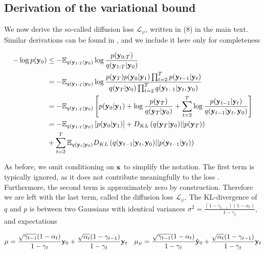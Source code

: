 \subsection{Derivation of the variational bound}

We now derive the so-called diffusion loss $\mathcal{L}_{\psi}$, written in (8) in the main text. Similar derivations can be found in \parencite{Kingma2021,Ribeiro2024}, and we include it here only for completeness

\begin{align*}
-\log p(\bold{y}_{0}) &\leq - \mathbb{E}_{q(\bold{y}_{1:T}\lvert\bold{y}_{0})} \log \frac{p(\bold{y}_{0:T})}{q(\bold{y}_{1:T}\lvert\bold{y}_{0})}\\
&= -\mathbb{E}_{q(\bold{y}_{1:T}\lvert\bold{y}_{0})} \log \frac{p(\bold{y}_{T})p(\bold{y}_0\lvert\bold{y}_1) \prod_{t=2}^{T}p(\bold{y}_{t-1}\lvert\bold{y}_t)}{q(\bold{y}_T\lvert\bold{y}_0)\prod_{t=2}^{T}q(\bold{y}_{t-1}\lvert\bold{y}_t,\bold{y}_0)}\\
&= -\mathbb{E}_{q(\bold{y}_{1:T}\lvert\bold{y}_{0})} \left[ p(\bold{y}_0\lvert\bold{y}_1) + \log \frac{p(\bold{y}_{T})}{q(\bold{y}_T\lvert\bold{y}_0)} + \sum_{t=2}^{T} \log \frac{p(\bold{y}_{t-1}\lvert\bold{y}_t)}{q(\bold{y}_{t-1}\lvert\bold{y}_t,\bold{y}_0)}\right]\\
&= -\mathbb{E}_{q(\bold{y}_{1:T}\lvert\bold{y}_{0})} \left[ p(\bold{y}_0\lvert\bold{y}_1)\right] + D_{KL}\left(q(\bold{y}_T\lvert\bold{y}_0) \lvert\lvert p(\bold{y}_{T})\right) \\
&+ \sum_{t=2}^{T} \mathbb{E}_{q(\bold{y}_{t}\lvert\bold{y}_{0})} D_{KL}\left(q(\bold{y}_{t-1}\lvert\bold{y}_t,\bold{y}_0)\lvert\lvert p(\bold{y}_{t-1}\lvert\bold{y}_t) \right)
\end{align*}

As before, we omit conditioning on $\bold{x}$ to simplify the notation. The first term is typically ignored, as it does not contribute meaningfully to the loss \parencite{Ribeiro2024}. Furthermore, the second term is approximately zero by construction. Therefore we are left with the last term, called the diffusion loss $\mathcal{L}_{\psi}$. The KL-divergence of $q$ and $p$ is between two Gaussians with identical variances $\sigma^{2} = \frac{(1-\gamma_{t-1})(1-\alpha_{t})}{1-\gamma_{t}}$, and expectations

\begin{align*}
\mu = \frac{\sqrt{\gamma_{t-1}}(1-\alpha_{t})}{1-\gamma_{t}}\bold{y}_{0}+ \frac{\sqrt{\alpha_{t}}(1-\gamma_{t-1})}{{1-\gamma_{t}}}\bold{y}_{t} \quad \mu_{\psi} = \frac{\sqrt{\gamma_{t-1}}(1-\alpha_{t})}{1-\gamma_{t}}\hat{\bold{y}}_{0}+ \frac{\sqrt{\alpha_{t}}(1-\gamma_{t-1})}{{1-\gamma_{t}}}\bold{y}_{t}
\end{align*}

